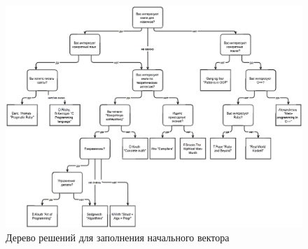\documentclass[simple,14pt,utf8,russian]{eskdtext}
\begin{document}
\begin{landscape}
    \begin{figure}[h]
        \centering
        \includegraphics[scale=0.62]{tree.eps}
        \caption{Дерево решений для заполнения начального вектора}
        \label{fig:tree}
    \end{figure}
\end{landscape}
    
\end{document}
